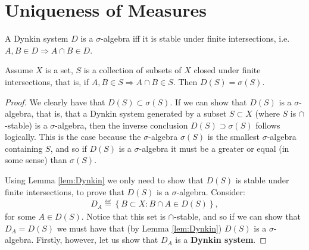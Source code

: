 \section{Uniqueness of Measures}

\begin{lemma}   \label{lem:Dynkin}
    A Dynkin system \(D\) is a \(\sigma\)-algebra iff it is stable under finite intersections, i.e. \(A,B \in D \Rightarrow A \cap B \in D\).
\end{lemma}
\begin{theorem}[Dynkin] \label{theorem:Dynkin}
    Assume \(X\) is a set, \(S\) is a collection of subsets of \(X\) closed under finite intersections, that is, if 
    \(A, B \in S \Rightarrow A \cap B \in S\). Then \(D(S) = \sigma(S)\).
\end{theorem}
\begin{proof}
    We clearly have that \(D(S) \subset \sigma(S)\). If we can show
    that \(D(S)\) is a \(\sigma\)-algebra, that is, that a Dynkin system generated by a subset \(S \subset X\) (where \(S\) is 
    \(\cap\)-stable) is a \(\sigma\)-algebra, then the inverse conclusion \(D(S) \supset \sigma(S)\) follows logically. This is the case
    because the \(\sigma\)-algebra \(\sigma(S)\) is the smallest \(\sigma\)-algebra containing \(S\), and so if \(D(S)\) is a 
    \(\sigma\)-algebra it must be a greater or equal (in some sense) than \(\sigma(S)\). 

    Using Lemma \ref{lem:Dynkin} we only need to show that \(D(S)\) is stable under finite intersections, to prove that \(D(S)\) is a
    \(\sigma\)-algebra. Consider:
    \begin{align*}
        D_{A} \eqdef \left\{B \subset X : B \cap A \in D(S)\right\},
    \end{align*}
    for some \(A\in D(S)\). Notice that this set is \(\cap\)-stable, and so if we can show that \(D_{A} = D(S)\) we must have that 
    (by Lemma \ref{lem:Dynkin}) \(D(S)\) is a \(\sigma\)-algebra. Firstly, however, let us show that \(D_{A}\) is a \textbf{Dynkin system}. 
    

\end{proof}

